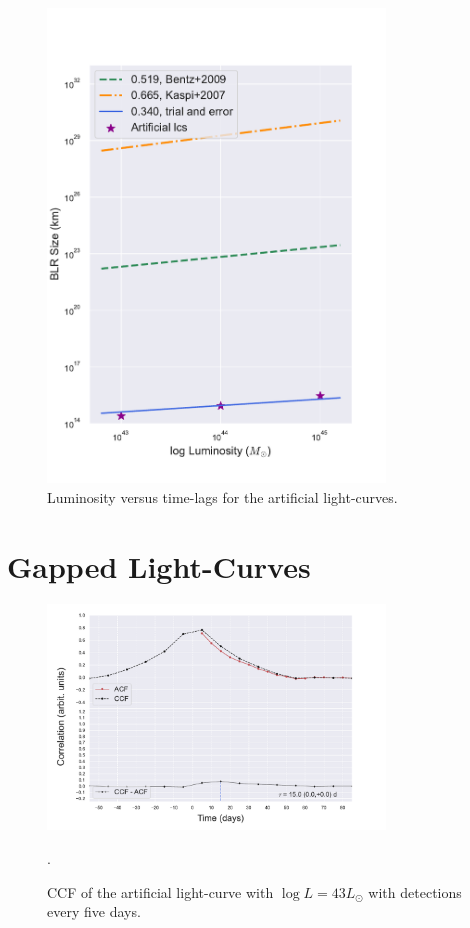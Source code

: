 \documentclass[letterpaper, oneside]{article}
\begin{document}
\begin{figure}
	\begin{center}
		\includegraphics[width=0.8\textwidth]{../other_plots/artificial_L_vs_timelag.pdf}
	\end{center}
	\caption{Luminosity versus time-lags for the artificial light-curves.}
	\label{fig:art_lum_vs_lag}
\end{figure}


\section{Gapped Light-Curves}

\begin{figure}[h]
	\centering
	\includegraphics[width=0.8\textwidth]{../artificial_x_y_5days.pdf}
	\caption{CCF of the artificial light-curve with $\log L = 43 L_{\odot}$ with detections every five days.}.
	\label{fig:ccf_art_lc_L43_5days}
\end{figure}
\end{document}

